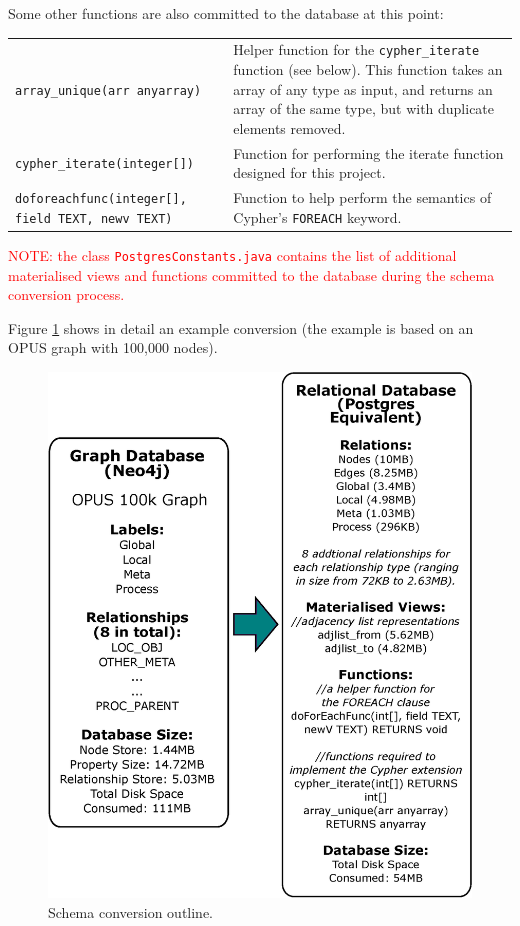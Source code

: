 \documentclass[letterpaper]{ltxdoc}
\begin{document}
Some other functions are also committed to the database at this point:

\begin{center}
\begin{tabular}{ p{4.5cm} p{9cm} }
\texttt{array\_unique(arr anyarray)} & Helper function for the \texttt{cypher\_iterate} function (see below). This function takes an array of any type as input, and returns an array of the same type, but with duplicate elements removed. \\

\texttt{cypher\_iterate(integer[])} & Function for performing the iterate function designed for this project. \\

\texttt{doforeachfunc(integer[], field TEXT, newv TEXT)} & Function to help perform the semantics of Cypher’s \texttt{FOREACH} keyword.
\end{tabular}
\end{center}

\medskip

\textcolor{red}{NOTE: the class \texttt{PostgresConstants.java} contains the list of additional materialised views and functions committed to the database during the schema conversion process.}

\medskip

Figure \ref{schemaConv} shows in detail an example conversion (the example is based on an OPUS graph with 100{,}000 nodes).

\begin{figure}[p]
\centerline{\includegraphics[width=\textwidth,height=\textheight,keepaspectratio]{schemaConv.eps}}
\caption{Schema conversion outline.}
\label{schemaConv}
\end{figure}
\end{document}
